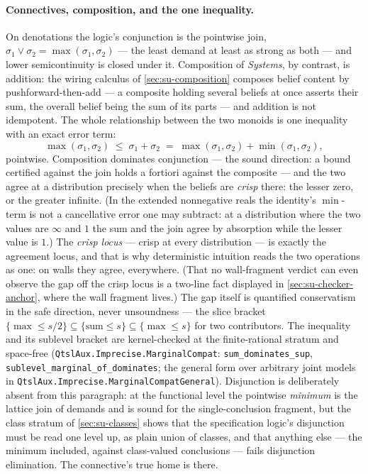 \paragraph{Connectives, composition, and the one inequality.}
On denotations the logic's conjunction is the pointwise join,
$\sigma_1 \vee \sigma_2 = \max(\sigma_1, \sigma_2)$ --- the least
demand at least as strong as both --- and lower semicontinuity is
closed under it. Composition of \emph{Systems}, by contrast, is
addition: the wiring calculus of
\autoref{sec:su-composition} composes belief content by
pushforward-then-add --- a composite holding several beliefs at once
asserts their sum, the overall belief being the sum of its parts
\cite{dalrymple26imprecise} --- and addition is not idempotent. The whole
relationship between the two monoids is one inequality with an exact
error term:
\[
  \max(\sigma_1, \sigma_2) \;\le\; \sigma_1 + \sigma_2
  \;=\; \max(\sigma_1, \sigma_2) + \min(\sigma_1, \sigma_2),
\]
pointwise. Composition dominates conjunction --- the sound direction:
a bound certified against the join holds a fortiori against the
composite --- and the two agree at a distribution precisely when the
beliefs are \emph{crisp} there: the lesser zero, or the greater
infinite. (In the extended nonnegative reals the identity's
$\min$-term is not a cancellative error one may subtract: at a
distribution
where the two values are $\infty$ and $1$ the sum and the join agree by
absorption while the lesser value is $1$.) The \emph{crisp locus}
--- crisp at every distribution --- is exactly the agreement locus, and
that is why deterministic intuition reads the two operations as one:
on walls they agree, everywhere. (That no wall-fragment verdict can
even observe the gap off the crisp locus is a two-line fact
displayed in \autoref{sec:su-checker-anchor}, where the wall
fragment lives.) The gap itself is quantified conservatism in the
safe direction, never unsoundness --- the slice bracket
$\{\max \le s/2\} \subseteq \{\mathrm{sum} \le s\} \subseteq
\{\max \le s\}$ for two contributors. The
inequality and its sublevel bracket are kernel-checked at the
finite-rational stratum and space-free
(\texttt{QtslAux.Imprecise.MarginalCompat}:
\texttt{sum\_dominates\_sup},
\texttt{sublevel\_marginal\_of\_dominates}; the general form over
arbitrary joint models in
\texttt{QtslAux.Imprecise.MarginalCompatGeneral}).
Disjunction is deliberately absent from this paragraph: at the
functional level the pointwise \emph{minimum} is the lattice join of
demands and is sound for the single-conclusion fragment, but the
class stratum of \autoref{sec:su-classes} shows that the
specification logic's disjunction must be read one level up, as
plain union of classes, and that anything else --- the minimum
included, against class-valued conclusions --- fails disjunction
elimination. The connective's true home is there.

